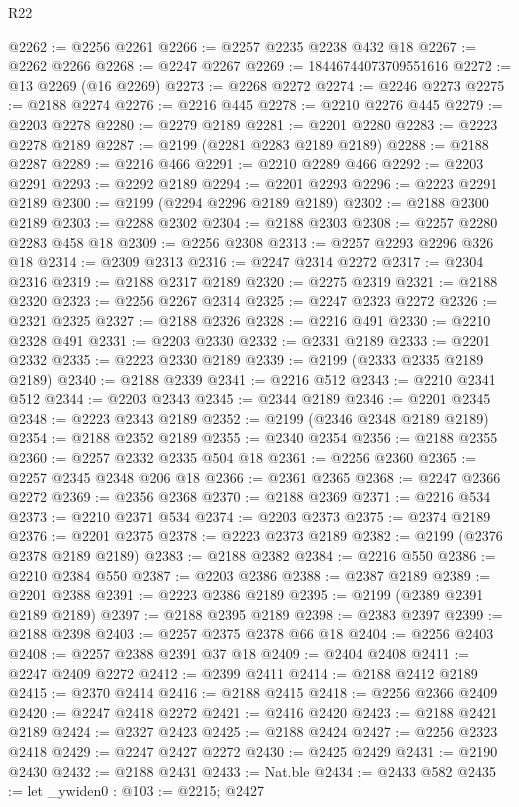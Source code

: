 \begin{lexlean}{R22}
\begin{coremodule}
@2262 := @2256 @2261
@2266 := @2257 @2235 @2238 @432 @18
@2267 := @2262 @2266
@2268 := @2247 @2267
@2269 := 18446744073709551616
@2272 := @13 @2269 (@16 @2269)
@2273 := @2268 @2272
@2274 := @2246 @2273
@2275 := @2188 @2274
@2276 := @2216 @445
@2278 := @2210 @2276 @445
@2279 := @2203 @2278
@2280 := @2279 @2189
@2281 := @2201 @2280
@2283 := @2223 @2278 @2189
@2287 := @2199 (@2281 @2283 @2189 @2189)
@2288 := @2188 @2287
@2289 := @2216 @466
@2291 := @2210 @2289 @466
@2292 := @2203 @2291
@2293 := @2292 @2189
@2294 := @2201 @2293
@2296 := @2223 @2291 @2189
@2300 := @2199 (@2294 @2296 @2189 @2189)
@2302 := @2188 @2300 @2189
@2303 := @2288 @2302
@2304 := @2188 @2303
@2308 := @2257 @2280 @2283 @458 @18
@2309 := @2256 @2308
@2313 := @2257 @2293 @2296 @326 @18
@2314 := @2309 @2313
@2316 := @2247 @2314 @2272
@2317 := @2304 @2316
@2319 := @2188 @2317 @2189
@2320 := @2275 @2319
@2321 := @2188 @2320
@2323 := @2256 @2267 @2314
@2325 := @2247 @2323 @2272
@2326 := @2321 @2325
@2327 := @2188 @2326
@2328 := @2216 @491
@2330 := @2210 @2328 @491
@2331 := @2203 @2330
@2332 := @2331 @2189
@2333 := @2201 @2332
@2335 := @2223 @2330 @2189
@2339 := @2199 (@2333 @2335 @2189 @2189)
@2340 := @2188 @2339
@2341 := @2216 @512
@2343 := @2210 @2341 @512
@2344 := @2203 @2343
@2345 := @2344 @2189
@2346 := @2201 @2345
@2348 := @2223 @2343 @2189
@2352 := @2199 (@2346 @2348 @2189 @2189)
@2354 := @2188 @2352 @2189
@2355 := @2340 @2354
@2356 := @2188 @2355
@2360 := @2257 @2332 @2335 @504 @18
@2361 := @2256 @2360
@2365 := @2257 @2345 @2348 @206 @18
@2366 := @2361 @2365
@2368 := @2247 @2366 @2272
@2369 := @2356 @2368
@2370 := @2188 @2369
@2371 := @2216 @534
@2373 := @2210 @2371 @534
@2374 := @2203 @2373
@2375 := @2374 @2189
@2376 := @2201 @2375
@2378 := @2223 @2373 @2189
@2382 := @2199 (@2376 @2378 @2189 @2189)
@2383 := @2188 @2382
@2384 := @2216 @550
@2386 := @2210 @2384 @550
@2387 := @2203 @2386
@2388 := @2387 @2189
@2389 := @2201 @2388
@2391 := @2223 @2386 @2189
@2395 := @2199 (@2389 @2391 @2189 @2189)
@2397 := @2188 @2395 @2189
@2398 := @2383 @2397
@2399 := @2188 @2398
@2403 := @2257 @2375 @2378 @66 @18
@2404 := @2256 @2403
@2408 := @2257 @2388 @2391 @37 @18
@2409 := @2404 @2408
@2411 := @2247 @2409 @2272
@2412 := @2399 @2411
@2414 := @2188 @2412 @2189
@2415 := @2370 @2414
@2416 := @2188 @2415
@2418 := @2256 @2366 @2409
@2420 := @2247 @2418 @2272
@2421 := @2416 @2420
@2423 := @2188 @2421 @2189
@2424 := @2327 @2423
@2425 := @2188 @2424
@2427 := @2256 @2323 @2418
@2429 := @2247 @2427 @2272
@2430 := @2425 @2429
@2431 := @2190 @2430
@2432 := @2188 @2431
@2433 := Nat.ble
@2434 := @2433 @582
@2435 := let _ywiden0 : @103 := @2215; @2427

\end{coremodule}
\end{lexlean}
